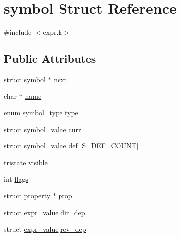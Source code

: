 \hypertarget{structsymbol}{\section{symbol Struct Reference}
\label{structsymbol}
}


{\ttfamily \#include $<$expr.\-h$>$}

\subsection*{Public Attributes}
\begin{DoxyCompactItemize}
\item 
struct \hyperlink{structsymbol}{symbol} $\ast$ \hyperlink{structsymbol_a183c6511350f3ecc3dbac04c1809ff75}{next}
\item 
char $\ast$ \hyperlink{structsymbol_a4fad8f11a2b2d8a21dcb4f5623d6c0fd}{name}
\item 
enum \hyperlink{expr_8h_a9e6705a3296471be728a3b6570b56231}{symbol\-\_\-type} \hyperlink{structsymbol_aafff7593df974a98ea04be2b7450091e}{type}
\item 
struct \hyperlink{structsymbol__value}{symbol\-\_\-value} \hyperlink{structsymbol_ad02574e21ac51d3324fe5aa2694e1bc8}{curr}
\item 
struct \hyperlink{structsymbol__value}{symbol\-\_\-value} \hyperlink{structsymbol_a42e4de60f59ffa3e90af9c714d53020d}{def} \mbox{[}\hyperlink{expr_8h_a06fc87d81c62e9abb8790b6e5713c55ba3ba578f109613726ac36139494826070}{S\-\_\-\-D\-E\-F\-\_\-\-C\-O\-U\-N\-T}\mbox{]}
\item 
\hyperlink{expr_8h_af4926743b1e532e0b2ad24161ff942a3}{tristate} \hyperlink{structsymbol_aac614544cc3553f60cc6e89812c742fe}{visible}
\item 
int \hyperlink{structsymbol_a20cdf9053c06f341a9ae57be53522e26}{flags}
\item 
struct \hyperlink{structproperty}{property} $\ast$ \hyperlink{structsymbol_aa6b5419b3dceffc8ed3db4890072edbe}{prop}
\item 
struct \hyperlink{structexpr__value}{expr\-\_\-value} \hyperlink{structsymbol_abf3830a6d14c2bdc296f0065fd9c7b9d}{dir\-\_\-dep}
\item 
struct \hyperlink{structexpr__value}{expr\-\_\-value} \hyperlink{structsymbol_a3cad06a65d0ef816b9194995a859422b}{rev\-\_\-dep}
\end{DoxyCompactItemize}


